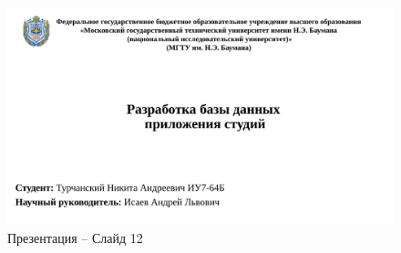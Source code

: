 \begin{appendices}
\begin{figure}[h]
	\begin{center}
		\includegraphics[page=12, width=\linewidth]{presentation.pdf}
	\end{center}
	\caption{Презентация -- Слайд 12}
\end{figure}

\end{appendices}

